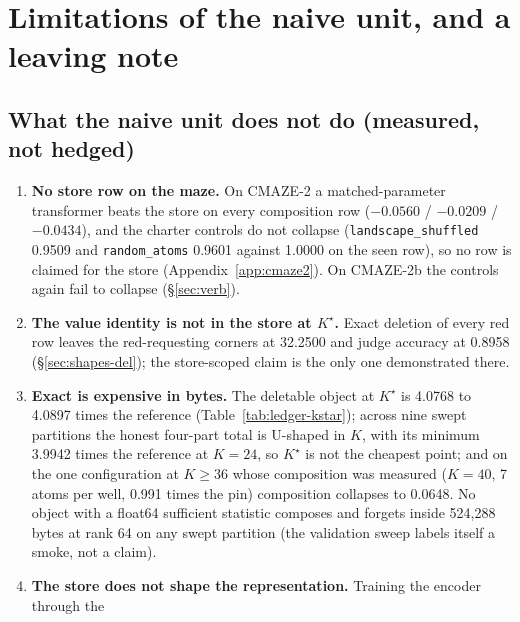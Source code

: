 \documentclass{article} %
\newcommand{\Kstar}{\ensuremath{K^{\star}}}
\begin{document}
\section{Limitations of the naive unit, and a leaving note}
\label{sec:limits}

\subsection{What the naive unit does not do (measured, not hedged)}
\label{sec:limits-list}

\begin{enumerate}[leftmargin=*,itemsep=1pt]
\item \textbf{No store row on the maze.} On CMAZE-2 a matched-parameter transformer beats the
  store on every composition row ($-0.0560$ / $-0.0209$ / $-0.0434$), and the charter controls do
  not collapse (\texttt{landscape\_shuffled} 0.9509 and \texttt{random\_atoms} 0.9601 against
  1.0000 on the seen row), so no row is claimed for the store (Appendix~\ref{app:cmaze2}). On
  CMAZE-2b the controls again fail to collapse (\S\ref{sec:verb}). %
\item \textbf{The value identity is not in the store at $\Kstar$.} Exact deletion of every red
  row leaves the red-requesting corners at 32.2500 and judge accuracy at 0.8958
  (\S\ref{sec:shapes-del}); the store-scoped claim is the only one demonstrated there.
\item \textbf{Exact is expensive in bytes.} The deletable object at $\Kstar$ is 4.0768 to 4.0897
  times the reference (Table~\ref{tab:ledger-kstar}); across nine swept partitions the honest
  four-part total is U-shaped in $K$, with its minimum 3.9942 times the reference at $K=24$, so
  $\Kstar$ is not the cheapest point; and on the one configuration at $K\ge36$ whose composition
  was measured ($K=40$, 7 atoms per well, 0.991 times the pin) composition collapses to 0.0648.
  No object with a float64 sufficient statistic composes and forgets inside 524,288 bytes at rank
  64 on any swept partition (the validation sweep labels itself a smoke, not a claim).
\item \textbf{The store does not shape the representation.} Training the encoder through the

\end{enumerate}
\end{document}
